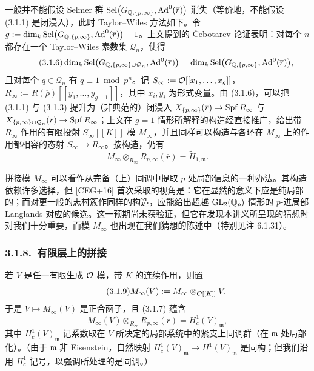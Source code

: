 一般并不能假设 Selmer 群 $\mathrm{Sel}\bigl(G_{\mathbb{Q},\{p,\infty\}},\mathrm{Ad}^0(\overline{r})\bigr)$ 消失（等价地，不能假设 (3.1.1) 是闭浸入），此时 Taylor--Wiles 方法如下。令 $g:=\dim_k \mathrm{Sel}\bigl(G_{\mathbb{Q},\{p,\infty\}},\mathrm{Ad}^0(\overline{r})\bigr)+1$。上文提到的 Čebotarev 论证表明：对每个 $n$ 都存在一个 Taylor--Wiles 素数集 $\mathcal{Q}_n$，使得
\begin{equation}
\tag{3.1.6}
\dim_k \mathrm{Sel}\bigl(G_{\mathbb{Q},\{p,\infty\}\cup\mathcal{Q}_n},\mathrm{Ad}^0(\overline{r})\bigr)=\dim_k \mathrm{Sel}\bigl(G_{\mathbb{Q},\{p,\infty\}},\mathrm{Ad}^0(\overline{r})\bigr),
\end{equation}
且对每个 $q\in\mathcal{Q}_n$ 有 $q\equiv1\bmod p^n$。记 $S_\infty:=\mathcal{O}[[x_1,\dots,x_g]]$，$R_\infty:=R(\overline{\rho})[[y_1,\dots,y_{g-1}]]$，其中 $x_i,y_i$ 为形式变量。由 (3.1.6)，可以把 (3.1.1) 与 (3.1.3) 提升为（非典范的）闭浸入 $X_{\{p,\infty\}}(\overline{r})\to\operatorname{Spf} R_\infty$ 与 $X_{\{p,\infty\}\cup\mathcal{Q}_n}(\overline{r})\to\operatorname{Spf} R_\infty$；上文在 $g=1$ 情形所解释的构造经直接推广，给出带 $R_\infty$ 作用的有限投射 $S_\infty[[K]]$-模 $M_\infty$，并且同样可以构造与各环在 $M_\infty$ 上的作用都相容的态射 $S_\infty\to R_\infty$。按构造，仍有
\begin{equation}
\tag{3.1.7}
M_\infty\otimes_{R_\infty}R_{p,\infty}(\overline{r})=\widetilde{H}_{1,\mathfrak{m}}.
\end{equation}

拼接模 $M_\infty$ 可以看作从完备（上）同调中提取 $p$ 处局部信息的一种办法。其构造依赖许多选择，但 [CEG+16] 首次采取的视角是：它在显然的意义下应是纯局部的；而对更一般的志村簇作同样的构造，应能给出超越 $\mathrm{GL}_2(\mathbb{Q}_p)$ 情形的 $p$-进局部 Langlands 对应的候选。这一预期尚未获验证，但它在发现本讲义所呈现的猜想时对我们十分重要，而模 $M_\infty$ 也出现在我们猜想的陈述中（特别见注 6.1.31）。

\subsubsection*{3.1.8.\ 有限层上的拼接}

若 $V$ 是任一有限生成 $\mathcal{O}$-模，带 $K$ 的连续作用，则置
\begin{equation}
\tag{3.1.9}
M_\infty(V):=M_\infty\otimes_{\mathcal{O}[[K]]}V.
\end{equation}
于是 $V\mapsto M_\infty(V)$ 是正合函子，且 (3.1.7) 蕴含
\[
M_\infty(V)\otimes_{R_\infty}R_{p,\infty}(\overline{r})=H^1_c(V)_{\mathfrak{m}},
\]
其中 $H^1_c(V)_{\mathfrak{m}}$ 记系数取在 $V$ 所决定的局部系统中的紧支上同调群（在 $\mathfrak{m}$ 处局部化）。（由于 $\mathfrak{m}$ 非 Eisenstein，自然映射 $H^1_c(V)_{\mathfrak{m}}\to H^1(V)_{\mathfrak{m}}$ 是同构；但我们沿用 $H^1_c$ 记号，以强调所处理的是同调。）

